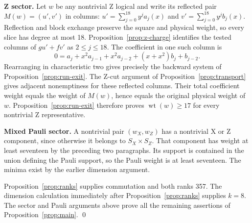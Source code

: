\documentclass{article}
\DeclareMathOperator{\wt}{wt}
\begin{document}
\textbf{Z sector.} Let \(w\) be any nontrivial Z logical and write its reflected pair
\(M(w) = (u', v')\) in columns: \(u' = \sum_{j=0}^{18} y^j a_j(x)\) and
\(v' = \sum_{j=0}^{18} y^j b_j(x)\). Reflection and block exchange preserve the square and
physical weight, so every slice has degree at most 18. Proposition~\ref{prop:z-charge} identifies
the tested columns of \(g u' + f v'\) as \(2 \le j \le 18\). The coefficient in one such
column is
\begin{equation}
  0 = a_j + x^2 a_{j-1} + x^2 a_{j-2} + (x + x^2) b_j + b_{j-2}.
\end{equation}
Rearranging in characteristic two gives precisely the backward system of
Proposition~\ref{prop:run-exit}. The Z-cut argument of Proposition~\ref{prop:transport} gives adjacent
nonemptiness for these reflected columns. Their total coefficient weight equals the weight of
\(M(w)\), hence equals the original physical weight of \(w\). Proposition~\ref{prop:run-exit}
therefore proves \(\wt(w) \ge 17\) for every nontrivial Z representative.

\textbf{Mixed Pauli sector.} A nontrivial pair \((w_X, w_Z)\) has a nontrivial X or Z
component, since otherwise it belongs to \(S_X \times S_Z\). That component has weight at
least seventeen by the preceding two paragraphs. Its support is contained in the union
defining the Pauli support, so the Pauli weight is at least seventeen. The minima exist by the
earlier dimension argument.

Proposition~\ref{prop:ranks} supplies commutation and both ranks 357. The dimension calculation
immediately after Proposition~\ref{prop:ranks} supplies \(k = 8\). The sector and Pauli arguments
above prove all the remaining assertions of Proposition~\ref{prop:main}. \qed
\end{document}
